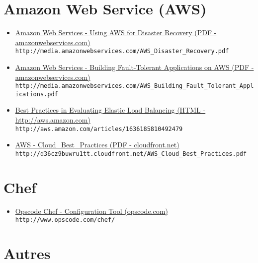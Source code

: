 \section{Amazon Web Service (AWS)}
\begin{itemize}         
\item \href{http://media.amazonwebservices.com/AWS_Disaster_Recovery.pdf}{Amazon
Web Services - Using AWS for Disaster Recovery (PDF - amazonwebservices.com)}\\
\verb?http://media.amazonwebservices.com/AWS_Disaster_Recovery.pdf?

\item \href{http://media.amazonwebservices.com/AWS_Building_Fault_Tolerant_Applications.pdf}{Amazon
Web Services - Building Fault-Tolerant Applications on AWS (PDF - amazonwebservices.com)}\\
\verb?http://media.amazonwebservices.com/AWS_Building_Fault_Tolerant_Applications.pdf?

\item \href{http://aws.amazon.com/articles/1636185810492479}{Best Practices in
Evaluating Elastic Load Balancing (HTML - http://aws.amazon.com)}\\
\verb?http://aws.amazon.com/articles/1636185810492479?

\item \href{http://d36cz9buwru1tt.cloudfront.net/AWS_Cloud_Best_Practices.pdf}{AWS
- Cloud\_Best\_Practices (PDF - cloudfront.net)}\\
\verb?http://d36cz9buwru1tt.cloudfront.net/AWS_Cloud_Best_Practices.pdf?
\end{itemize}         

\section{Chef}
\begin{itemize}
\item \href{http://www.opscode.com/chef/}{Opscode Chef - Configuration Tool (opscode.com)}\\
\verb?http://www.opscode.com/chef/?
\end{itemize}         
\section{Autres}

